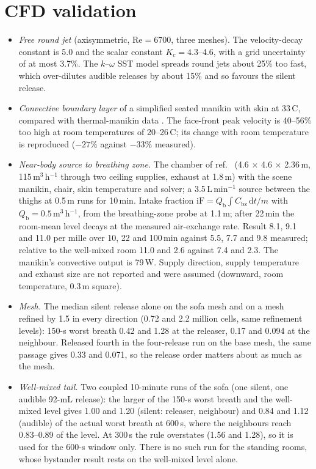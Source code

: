 \documentclass[11pt]{article}
\begin{document}
\section{CFD validation}
\label{sec:si-validation}
\begin{itemize}
  \item \emph{Free round jet} (axisymmetric, $\mathrm{Re} = 6700$, three meshes). The velocity-decay constant is 5.0 and
  the scalar constant $K_c = 4.3$--4.6, with a grid uncertainty of at most 3.7\%. The $k$--$\omega$ SST model spreads
  round jets about 25\% too fast, which over-dilutes audible releases by about 15\% and so favours the silent release.
  \item \emph{Convective boundary layer} of a simplified seated manikin with skin at 33\,\textdegree C, compared with
  thermal-manikin data \cite{licina2014}. The face-front peak velocity is 40--56\% too high at room temperatures of
  20--26\,\textdegree C; its change with room temperature is reproduced ($-27\%$ against $-33\%$ measured).
  \item \emph{Near-body source to breathing zone.} The chamber of ref.~ (4.6 $\times$ 4.6 $\times$
  2.36\,m, 115\,m$^3$\,h$^{-1}$ through two ceiling supplies, exhaust at 1.8\,m) with the scene manikin, chair, skin
  temperature and solver; a 3.5\,L\,min$^{-1}$ source between the thighs at 0.5\,m runs for 10\,min. Intake fraction
  $\mathrm{iF} = Q_\mathrm{b}\int C_\mathrm{bz}\,\mathrm{d}t / m$ with $Q_\mathrm{b} = 0.5$\,m$^3$\,h$^{-1}$, from the
  breathing-zone probe at 1.1\,m; after 22\,min the room-mean level decays at the measured air-exchange rate. Result
  8.1, 9.1 and 11.0 per mille over 10, 22 and 100\,min against 5.5, 7.7 and 9.8 measured; relative to the well-mixed
  room 11.0 and 2.6 against 7.4 and 2.3. The manikin's convective output is 79\,W. Supply direction, supply
  temperature and exhaust size are not reported and were assumed (downward, room temperature, 0.3\,m square).
  \item \emph{Mesh.} The median silent release alone on the sofa mesh and on a mesh refined by 1.5 in every direction
  (0.72 and 2.2 million cells, same refinement levels): 150-s worst breath 0.42 and 1.28 at the releaser, 0.17 and
  0.094 at the neighbour. Released fourth in the four-release run on the base mesh, the same passage gives 0.33 and
  0.071, so the release order matters about as much as the mesh.
  \item \emph{Well-mixed tail.} Two coupled 10-minute runs of the sofa (one silent, one audible 92-mL release): the
  larger of the 150-s worst breath and the well-mixed level gives 1.00 and 1.20 (silent: releaser, neighbour) and
  0.84 and 1.12 (audible) of the actual worst breath at 600\,s, where the neighbours reach 0.83--0.89 of the level. At
  300\,s the rule overstates (1.56 and 1.28), so it is used for the 600-s window only. There is no such run for the
  standing rooms, whose bystander result rests on the well-mixed level alone.
\end{itemize}
\end{document}
